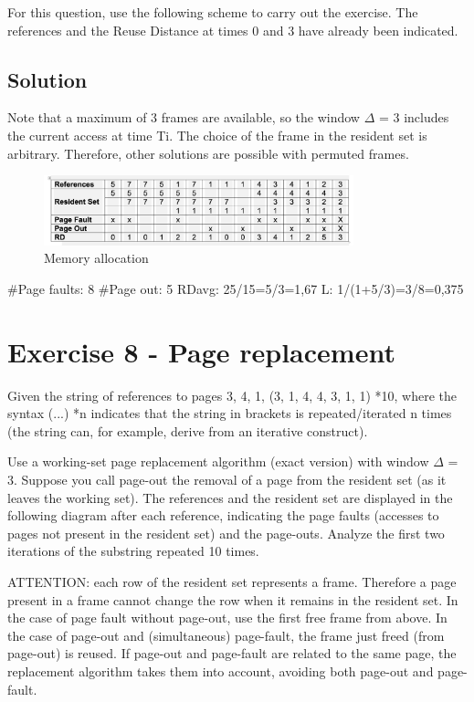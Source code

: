 For this question, use the following scheme to carry out the exercise. The references and the Reuse Distance at times 0 and 3 have already been indicated.

\subsection{Solution}

Note that a maximum of 3 frames are available, so the window $\Delta$ = 3 includes the current access at time Ti. The choice of the frame in the resident set is arbitrary. Therefore, other solutions are possible with permuted frames.

\begin{figure}[hbt]
  \centering
  \includegraphics[width=0.8\textwidth]{images/ex07.png}
  \caption{Memory allocation}
\end{figure}

\#Page faults: 8 
\#Page out: 5	
RDavg: 25/15=5/3=1,67  	
L:  1/(1+5/3)=3/8=0,375 


\section{Exercise 8 - Page replacement}

Given the string of references to pages 3, 4, 1, (3, 1, 4, 4, 3, 1, 1) *10, where the syntax (...) *n indicates that the string in brackets is repeated/iterated n times (the string can, for example, derive from an iterative construct).

Use a working-set page replacement algorithm (exact version) with window $\Delta$ = 3. Suppose you call page-out the removal of a page from the resident set (as it leaves the working set). The references and the resident set are displayed in the following diagram after each reference, indicating the page faults (accesses to pages not present in the resident set) and the page-outs. Analyze the first two iterations of the substring repeated 10 times. 

ATTENTION: each row of the resident set represents a frame. Therefore a page present in a frame cannot change the row when it remains in the resident set. In the case of page fault without page-out, use the first free frame from above. In the case of page-out and (simultaneous) page-fault, the frame just freed (from page-out) is reused. If page-out and page-fault are related to the same page, the replacement algorithm takes them into account, avoiding both page-out and page-fault.


